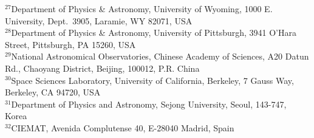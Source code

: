 {$^{27}$Department of Physics \& Astronomy, University  of Wyoming, 1000 E. University, Dept.~3905, Laramie, WY 82071, USA\\ 
$^{28}$Department of Physics \& Astronomy, University of Pittsburgh, 3941 O'Hara Street, Pittsburgh, PA 15260, USA\\ 
$^{29}$National Astronomical Observatories, Chinese Academy of Sciences, A20 Datun Rd., Chaoyang District, Beijing, 100012, P.R. China\\ 
$^{30}$Space Sciences Laboratory, University of California, Berkeley, 7 Gauss Way, Berkeley, CA  94720, USA\\ 
$^{31}$Department of Physics and Astronomy, Sejong University, Seoul, 143-747, Korea\\ 
$^{32}$CIEMAT, Avenida Complutense 40, E-28040 Madrid, Spain}